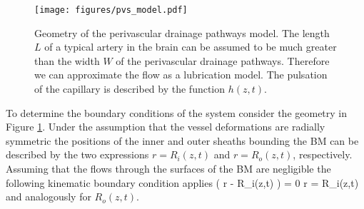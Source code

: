 \documentclass[a4paper,titlepage]{scrartcl}
\begin{document}
\begin{figure}
\centerline{\texttt{[image: figures/pvs\_model.pdf]}}
\caption{Geometry of the perivascular drainage pathways model. The length $L$ of a typical artery in the brain can be assumed to be much greater than the width $W$ of the perivascular drainage pathways. Therefore we can approximate the flow as a lubrication model. The pulsation of the capillary is described by the function $h(z,t)$.\label{fig:pvs_model}}
\end{figure}

To determine the boundary conditions of the system consider the geometry in Figure \ref{fig:pvs_model}. Under the assumption that the vessel deformations are radially symmetric the positions of the inner and outer sheaths bounding the BM can be described by the two expressions $r = R_i(z,t)$ and $r = R_o(z,t)$, respectively. Assuming that the flows through the surfaces of the BM are negligible the following kinematic boundary condition applies
\beq \label{eq:kinematic}  
 \left( r - R_i(z,t) \right) = 0 \quad {} r = R_i(z,t)
\eeq
and analogously for $R_o(z,t)$.
\end{document}
